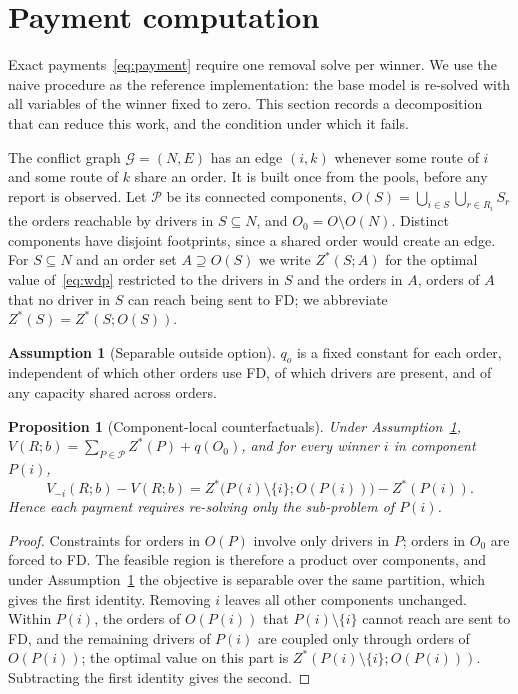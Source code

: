 \documentclass[review,12pt]{elsarticle}
\newtheorem{proposition}[theorem]{Proposition}
\theoremstyle{definition}
\newtheorem{assumption}{Assumption}
\theoremstyle{remark}
\begin{document}
\section{Payment computation}
\label{sec:payments}

Exact payments~\eqref{eq:payment} require one removal solve per winner. We
use the naive procedure as the reference implementation: the base model is
re-solved with all variables of the winner fixed to zero. This section
records a decomposition that can reduce this work, and the condition under
which it fails.

The conflict graph $\mathcal G=(N,E)$ has an edge $(i,k)$ whenever some
route of $i$ and some route of $k$ share an order. It is built once from the
pools, before any report is observed. Let $\mathcal P$ be its connected
components, $O(S)=\bigcup_{i\in S}\bigcup_{r\in R_i}S_r$ the orders reachable
by drivers in $S\subseteq N$, and $O_0=O\setminus O(N)$. Distinct components
have disjoint footprints, since a shared order would create an edge. For
$S\subseteq N$ and an order set $A\supseteq O(S)$ we write $Z^\ast(S;A)$ for
the optimal value of~\eqref{eq:wdp} restricted to the drivers in $S$ and the
orders in $A$, orders of $A$ that no driver in $S$ can reach being sent to
FD; we abbreviate $Z^\ast(S)=Z^\ast(S;O(S))$.

\begin{assumption}[Separable outside option]
\label{ass:separable}
$q_o$ is a fixed constant for each order, independent of which other orders
use FD, of which drivers are present, and of any capacity shared across
orders.
\end{assumption}

\begin{proposition}[Component-local counterfactuals]
\label{prop:decomp}
Under Assumption~\ref{ass:separable},
$V(R;b)=\sum_{P\in\mathcal P}Z^\ast(P)+q(O_0)$, and for every winner $i$ in
component $P(i)$,
\[
V_{-i}(R;b)-V(R;b)=Z^\ast\bigl(P(i)\setminus\{i\};O(P(i))\bigr)-Z^\ast(P(i)).
\]
Hence each payment requires re-solving only the sub-problem of $P(i)$.
\end{proposition}

\begin{proof}
Constraints for orders in $O(P)$ involve only drivers in $P$; orders in $O_0$
are forced to FD. The feasible region is therefore a product over
components, and under Assumption~\ref{ass:separable} the objective is
separable over the same partition, which gives the first identity. Removing
$i$ leaves all other components unchanged. Within $P(i)$, the orders of
$O(P(i))$ that $P(i)\setminus\{i\}$ cannot reach are sent to FD, and the
remaining drivers of $P(i)$ are coupled only through orders of $O(P(i))$;
the optimal value on this part is $Z^\ast(P(i)\setminus\{i\};O(P(i)))$.
Subtracting the first identity gives the second.
\end{proof}
\end{document}
